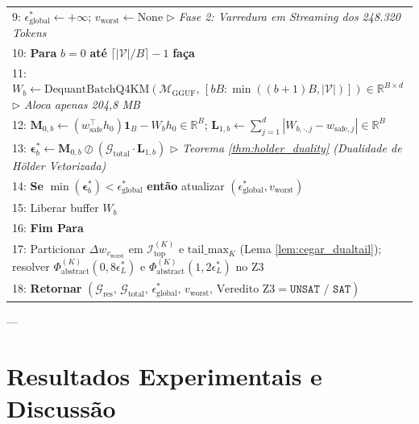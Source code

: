 \documentclass[11pt,a4paper]{article}
\theoremstyle{definition}
\begin{document}
\begin{table}[!ht]
\begin{tabularx}{\linewidth}{X}
9: $\epsilon_{\text{global}}^* \gets +\infty$; \quad $v_{\text{worst}} \gets \text{None}$ \hfill $\triangleright$ \textit{Fase 2: Varredura em Streaming dos 248.320 Tokens} \\
10: \textbf{Para} $b = 0$ \textbf{até} $\lceil |\mathcal{V}|/B \rceil - 1$ \textbf{faça} \\
11: \hspace{0.5cm} $W_b \gets \text{DequantBatchQ4KM}(\mathcal{M}_{\text{GGUF}},\, [bB : \min((b+1)B, |\mathcal{V}|)]) \in \mathbb{R}^{B \times d}$ \hfill $\triangleright$ \textit{Aloca apenas 204,8 MB} \\
12: \hspace{0.5cm} $\mathbf{M}_{0,b} \gets (w_{\text{safe}}^\top h_0)\mathbf{1}_B - W_b h_0 \in \mathbb{R}^B$; \quad $\mathbf{L}_{1,b} \gets \sum_{j=1}^d |W_{b,\cdot,j} - w_{\text{safe},j}| \in \mathbb{R}^B$ \\
13: \hspace{0.5cm} $\boldsymbol{\epsilon}_b^* \gets \mathbf{M}_{0,b} \oslash (\mathcal{G}_{\text{total}} \cdot \mathbf{L}_{1,b})$ \hfill $\triangleright$ \textit{Teorema \ref{thm:holder_duality} (Dualidade de Hölder Vetorizada)} \\
14: \hspace{0.5cm} \textbf{Se} $\min(\boldsymbol{\epsilon}_b^*) < \epsilon_{\text{global}}^*$ \textbf{então} atualizar $(\epsilon_{\text{global}}^*, v_{\text{worst}})$ \\
15: \hspace{0.5cm} Liberar buffer $W_b$ \\
16: \textbf{Fim Para} \\
17: Particionar $\Delta w_{v_{\text{worst}}}$ em $\mathcal{I}_{\text{top}}^{(K)}$ e $\mathrm{tail\_max}_K$ (Lema \ref{lem:cegar_dualtail}); resolver $\Phi_{\text{abstract}}^{(K)}(0{,}8\epsilon_L^*)$ e $\Phi_{\text{abstract}}^{(K)}(1{,}2\epsilon_L^*)$ no Z3 \\
18: \textbf{Retornar} $(\mathcal{G}_{\text{res}},\, \mathcal{G}_{\text{total}},\, \epsilon_{\text{global}}^*,\, v_{\text{worst}},\, \text{Veredito Z3} = \texttt{UNSAT / SAT})$ \\
\bottomrule
\end{tabularx}
\end{table}

---

\section{Resultados Experimentais e Discussão}
\end{document}
